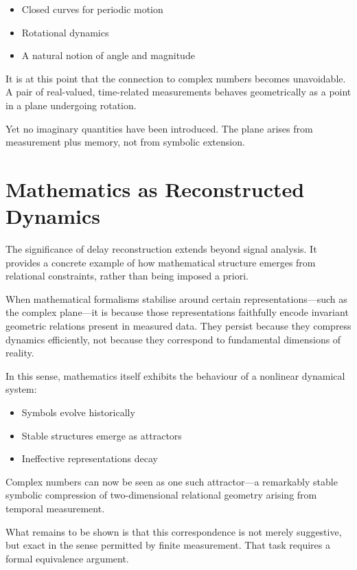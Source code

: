 \documentclass[12pt]{book}  %
\begin{document}
\begin{itemize}
    \item Closed curves for periodic motion
    \item Rotational dynamics
    \item A natural notion of angle and magnitude
\end{itemize}

It is at this point that the connection to complex numbers becomes unavoidable. A pair of real-valued, time-related measurements behaves geometrically as a point in a plane undergoing rotation.

Yet no imaginary quantities have been introduced. The plane arises from measurement plus memory, not from symbolic extension.

\section*{Mathematics as Reconstructed Dynamics}

The significance of delay reconstruction extends beyond signal analysis. It provides a concrete example of how mathematical structure emerges from relational constraints, rather than being imposed a priori.

When mathematical formalisms stabilise around certain representations—such as the complex plane—it is because those representations faithfully encode invariant geometric relations present in measured data. They persist because they compress dynamics efficiently, not because they correspond to fundamental dimensions of reality.

In this sense, mathematics itself exhibits the behaviour of a nonlinear dynamical system:

\begin{itemize}
    \item Symbols evolve historically
    \item Stable structures emerge as attractors
    \item Ineffective representations decay
\end{itemize}

Complex numbers can now be seen as one such attractor—a remarkably stable symbolic compression of two-dimensional relational geometry arising from temporal measurement.

What remains to be shown is that this correspondence is not merely suggestive, but exact in the sense permitted by finite measurement. That task requires a formal equivalence argument.
\end{document}
